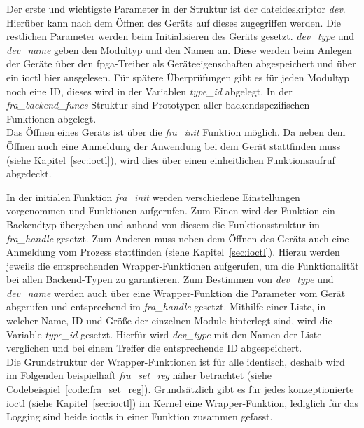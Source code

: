 Der erste und wichtigste Parameter in der Struktur ist der \gls{dateideskriptor} \textit{dev}. Hierüber kann nach dem Öffnen des Geräts auf dieses zugegriffen werden. Die restlichen Parameter werden beim Initialisieren des Geräts gesetzt. \textit{dev\_type} und \textit{dev\_name} geben den Modultyp und den Namen an. Diese werden beim Anlegen der Geräte über den \ac{fpga}-Treiber als Geräteeigenschaften abgespeichert und über ein \ac{ioctl} hier ausgelesen.
Für spätere Überprüfungen gibt es für jeden Modultyp noch eine ID, dieses wird in der Variablen \textit{type\_id} abgelegt. In der \textit{fra\_backend\_funcs} Struktur sind Prototypen aller backendspezifischen Funktionen abgelegt. \\

Das Öffnen eines Geräts ist über die \textit{fra\_init} Funktion möglich. Da neben dem Öffnen auch eine Anmeldung der Anwendung bei dem Gerät stattfinden muss (siehe Kapitel~\ref{sec:ioctl}), wird dies über einen einheitlichen Funktionsaufruf abgedeckt. 

In der initialen Funktion \textit{fra\_init} werden verschiedene Einstellungen vorgenommen und Funktionen aufgerufen. Zum Einen wird der Funktion ein Backendtyp übergeben und anhand von diesem die Funktionsstruktur im \textit{fra\_handle} gesetzt.
Zum Anderen muss neben dem Öffnen des Geräts auch eine Anmeldung vom Prozess stattfinden (siehe Kapitel~\ref{sec:ioctl}). Hierzu werden jeweils die entsprechenden Wrapper-Funktionen aufgerufen, um die Funktionalität bei allen Backend-Typen zu garantieren. Zum Bestimmen von \textit{dev\_type} und \textit{dev\_name} werden auch über eine Wrapper-Funktion die Parameter vom Gerät abgerufen und entsprechend im \textit{fra\_handle} gesetzt. Mithilfe einer Liste, in welcher Name, ID und Größe der einzelnen Module hinterlegt sind, wird die Variable \textit{type\_id} gesetzt. Hierfür wird \textit{dev\_type} mit den Namen der Liste verglichen und bei einem Treffer die entsprechende ID abgespeichert.\\


Die Grundstruktur der Wrapper-Funktionen ist für alle identisch, deshalb wird im Folgenden beispielhaft \textit{fra\_set\_reg} näher betrachtet (siehe Codebeispiel~\ref{code:fra_set_reg}). Grundsätzlich gibt es für jedes konzeptionierte \ac{ioctl} (siehe Kapitel~\ref{sec:ioctl}) im Kernel eine Wrapper-Funktion, lediglich für das Logging sind beide \ac{ioctl}s in einer Funktion zusammen gefasst.\\ 


